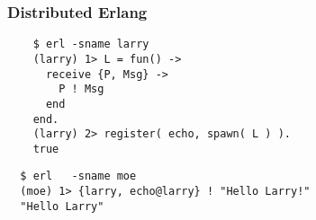 \documentclass{beamer}
\begin{document}
\begin{frame}[fragile]

  \frametitle{Distributed Erlang}
  \begin{Verbatim}
    $ erl -sname larry
    (larry) 1> L = fun() ->
      receive {P, Msg} ->
        P ! Msg
      end
    end.
    (larry) 2> register( echo, spawn( L ) ).
    true
  \end{Verbatim}

  \begin{Verbatim}
  $ erl   -sname moe
  (moe) 1> {larry, echo@larry} ! "Hello Larry!"
  "Hello Larry"
  \end{Verbatim}

\end{frame}
\end{document}
